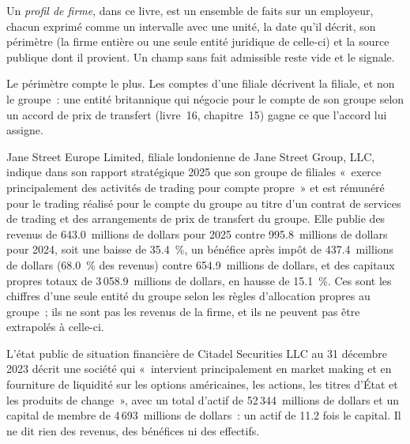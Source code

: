 \begin{definition}\label{def:in:proprietary-market-makers-and-high-frequency-firms:profile}
Un \emph{profil de firme}, dans ce livre, est un ensemble de faits sur un employeur, chacun exprimé comme un intervalle avec une unité,
la date qu'il décrit, son périmètre (la firme entière ou une seule entité juridique de celle-ci) et la source publique dont il provient. Un champ
sans fait admissible reste vide et le signale.
\end{definition}

Le périmètre compte le plus. Les comptes d'une filiale décrivent la filiale, et non le groupe~: une entité britannique qui négocie pour le compte
de son groupe selon un accord de prix de transfert (livre~16, chapitre~15) gagne ce que l'accord lui assigne.

\begin{example}\label{ex:in:proprietary-market-makers-and-high-frequency-firms:jse}
Jane Street Europe Limited, filiale londonienne de Jane Street Group, LLC, indique dans son rapport stratégique 2025
que son groupe de filiales «~exerce principalement des activités de trading pour compte propre~» et est rémunéré pour le trading
réalisé pour le compte du groupe au titre d'un contrat de services de trading et des arrangements de prix de transfert du groupe. Elle
publie des revenus de 643.0~millions de dollars pour 2025 contre 995.8~millions de dollars pour 2024, soit une baisse de 35.4~\%, un bénéfice après impôt de
437.4~millions de dollars (68.0~\% des revenus) contre 654.9~millions de dollars, et des capitaux propres totaux de 3\,058.9~millions de dollars, en hausse de 15.1~\%. Ces
sont les chiffres d'une seule entité du groupe selon les règles d'allocation propres au groupe~; ils ne sont pas les revenus de la firme, et
ils ne peuvent pas être extrapolés à celle-ci.
\end{example}

\begin{example}\label{ex:in:proprietary-market-makers-and-high-frequency-firms:cdrg}
L'état public de situation financière de Citadel Securities LLC au 31 décembre 2023 décrit une société qui
«~intervient principalement en market making et en fourniture de liquidité sur les options américaines, les actions, les titres d'État et
les produits de change~», avec un total d'actif de 52\,344~millions de dollars et un capital de membre de 4\,693~millions de dollars~: un actif de
11.2 fois le capital. Il ne dit rien des revenus, des bénéfices ni des effectifs.
\end{example}

